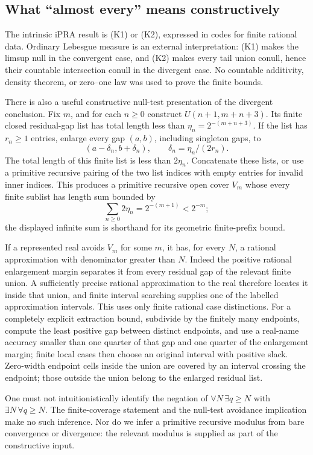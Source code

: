 \subsection{What ``almost every'' means constructively}

The intrinsic iPRA result is (K1) or (K2), expressed in codes for finite
rational data.  Ordinary Lebesgue measure is an external interpretation:
(K1) makes the limsup null in the convergent case, and (K2) makes every
tail union conull, hence their countable intersection conull in the
divergent case.  No countable additivity, density theorem, or zero--one
law was used to prove the finite bounds.

There is also a useful constructive null-test presentation of the
divergent conclusion.  Fix $m$, and for each $n\geq0$ construct
$U(n+1,m+n+3)$.  Its finite closed residual-gap list has total length
less than $\eta_n=2^{-(m+n+3)}$.  If the list has $r_n\geq1$ entries,
enlarge every gap $(a,b)$, including singleton gaps, to
\[
 (a-\delta_n,b+\delta_n),\qquad
 \delta_n=\eta_n/(2r_n).
\]
The total length of this finite list is less than $2\eta_n$.  Concatenate
these lists, or use a primitive recursive pairing of the two list
indices with empty entries for invalid inner indices.  This produces a
primitive recursive open cover $V_m$ whose every finite sublist has
length sum bounded by
\[
 \sum_{n\geq0}2\eta_n=2^{-(m+1)}<2^{-m};
\]
the displayed infinite sum is shorthand for its geometric finite-prefix
bound.

If a represented real avoids $V_m$ for some $m$, it has, for every $N$,
a rational approximation with denominator greater than $N$.  Indeed the
positive rational enlargement margin separates it from every residual
gap of the relevant finite union.  A sufficiently precise rational
approximation to the real therefore locates it inside that union, and
finite interval searching supplies one of the labelled approximation
intervals.  This uses only finite rational case distinctions.  For a
completely explicit extraction bound, subdivide by the finitely many
endpoints, compute the least positive gap between distinct endpoints,
and use a real-name accuracy smaller than one quarter of that gap and
one quarter of the enlargement margin; finite local cases then choose
an original interval with positive slack.  Zero-width endpoint cells
inside the union are covered by an interval crossing the endpoint;
those outside the union belong to the enlarged residual list.

One must not intuitionistically identify the negation of
$\forall N\,\exists q\geq N$ with $\exists N\,\forall q\geq N$.
The finite-coverage statement and the null-test avoidance implication
make no such inference.  Nor do we infer a primitive recursive modulus
from bare convergence or divergence: the relevant modulus is supplied
as part of the constructive input.
